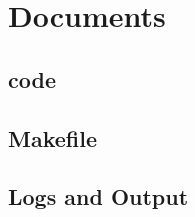 \documentclass[a4paper]{article}
\begin{document}
\section{Documents}
\subsection{code}


\subsection{Makefile}

\subsection{Logs and Output}

\end{document}
